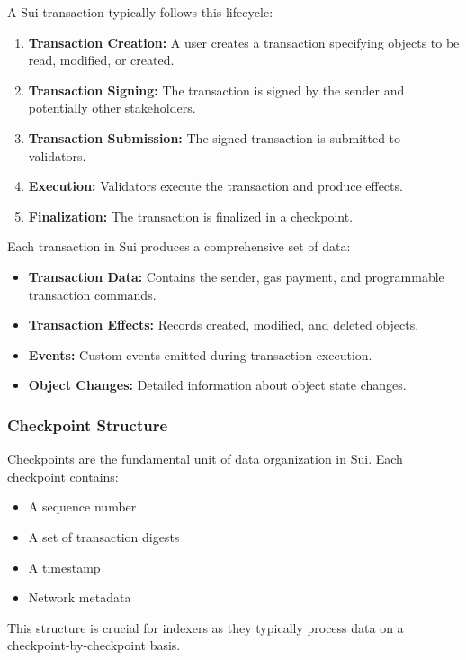 A Sui transaction typically follows this lifecycle:

\begin{enumerate}
    \item \textbf{Transaction Creation:} A user creates a transaction specifying objects to be read, modified, or created.
    \item \textbf{Transaction Signing:} The transaction is signed by the sender and potentially other stakeholders.
    \item \textbf{Transaction Submission:} The signed transaction is submitted to validators.
    \item \textbf{Execution:} Validators execute the transaction and produce effects.
    \item \textbf{Finalization:} The transaction is finalized in a checkpoint.
\end{enumerate}

Each transaction in Sui produces a comprehensive set of data:

\begin{itemize}
    \item \textbf{Transaction Data:} Contains the sender, gas payment, and programmable transaction commands.
    \item \textbf{Transaction Effects:} Records created, modified, and deleted objects.
    \item \textbf{Events:} Custom events emitted during transaction execution.
    \item \textbf{Object Changes:} Detailed information about object state changes.
\end{itemize}

\subsubsection{Checkpoint Structure}

Checkpoints are the fundamental unit of data organization in Sui. Each checkpoint contains:

\begin{itemize}
    \item A sequence number
    \item A set of transaction digests
    \item A timestamp
    \item Network metadata
\end{itemize}

This structure is crucial for indexers as they typically process data on a checkpoint-by-checkpoint basis.

